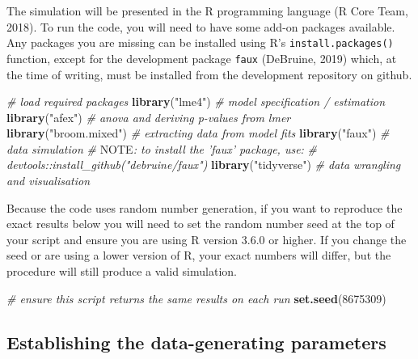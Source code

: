 \documentclass[doc,floatsintext]{apa6}
\newenvironment{Shaded}{\begin{snugshade}}{\end{snugshade}}
\newcommand{\KeywordTok}[1]{\textcolor[rgb]{0.13,0.29,0.53}{\textbf{#1}}}
\newcommand{\DecValTok}[1]{\textcolor[rgb]{0.00,0.00,0.81}{#1}}
\newcommand{\StringTok}[1]{\textcolor[rgb]{0.31,0.60,0.02}{#1}}
\newcommand{\CommentTok}[1]{\textcolor[rgb]{0.56,0.35,0.01}{\textit{#1}}}
\newcommand{\AlertTok}[1]{\textcolor[rgb]{0.94,0.16,0.16}{#1}}
\newcommand{\NormalTok}[1]{#1}
\begin{document}
The simulation will be presented in the R programming language (R Core
Team, 2018). To run the code, you will need to have some add-on packages
available. Any packages you are missing can be installed using R's
\texttt{install.packages()} function, except for the development package
\texttt{faux} (DeBruine, 2019) which, at the time of writing, must be
installed from the development repository on github.

\begin{Shaded}
\begin{Highlighting}[]
\CommentTok{# load required packages}
\KeywordTok{library}\NormalTok{(}\StringTok{"lme4"}\NormalTok{)        }\CommentTok{# model specification / estimation}
\KeywordTok{library}\NormalTok{(}\StringTok{"afex"}\NormalTok{)        }\CommentTok{# anova and deriving p-values from lmer}
\KeywordTok{library}\NormalTok{(}\StringTok{"broom.mixed"}\NormalTok{) }\CommentTok{# extracting data from model fits }
\KeywordTok{library}\NormalTok{(}\StringTok{"faux"}\NormalTok{)        }\CommentTok{# data simulation}
\CommentTok{# }\AlertTok{NOTE}\CommentTok{: to install the 'faux' package, use:}
\CommentTok{# devtools::install_github("debruine/faux")}
\KeywordTok{library}\NormalTok{(}\StringTok{"tidyverse"}\NormalTok{)   }\CommentTok{# data wrangling and visualisation}
\end{Highlighting}
\end{Shaded}

Because the code uses random number generation, if you want to reproduce
the exact results below you will need to set the random number seed at
the top of your script and ensure you are using R version 3.6.0 or
higher. If you change the seed or are using a lower version of R, your
exact numbers will differ, but the procedure will still produce a valid
simulation.

\begin{Shaded}
\begin{Highlighting}[]
\CommentTok{# ensure this script returns the same results on each run}
\KeywordTok{set.seed}\NormalTok{(}\DecValTok{8675309}\NormalTok{)}
\end{Highlighting}
\end{Shaded}

\subsection{Establishing the data-generating
parameters}\label{establishing-the-data-generating-parameters}
\end{document}
